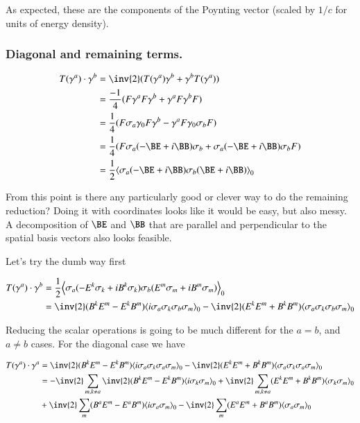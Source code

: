 As expected, these are the components of the Poynting vector (scaled by $1/c$ for units of energy density).

\subsubsection{Diagonal and remaining terms. }

\begin{align*}
T(\gamma^a) \cdot \gamma^b 
&= \inv{2} (T(\gamma^a) \gamma^b + \gamma^b T(\gamma^a)) \\
&= \frac{-1}{4} (F \gamma^a F \gamma^b + \gamma^a F \gamma^b F) \\
&= \frac{1}{4} (F \sigma_a \gamma_0 F \gamma^b - \gamma^a F \gamma_0 \sigma_b F) \\
&= \frac{1}{4} (F \sigma_a (-\BE + i \BB) \sigma_b + \sigma_a (-\BE + i \BB) \sigma_b F) \\
&= \frac{1}{2} \gpgradezero{\sigma_a (-\BE + i \BB) \sigma_b (\BE + i\BB) } \\
\end{align*}

From this point is there any particularly good or clever way to do the remaining reduction?  Doing it with 
coordinates looks like it would be easy, but also messy.  A decomposition of $\BE$ and $\BB$ that are parallel
and perpendicular to the spatial basis vectors also looks feasible.

Let's try the dumb way first

\begin{align*}
T(\gamma^a) \cdot \gamma^b 
&= \frac{1}{2} \gpgradezero{\sigma_a (-E^k \sigma_k + i B^k \sigma_k) \sigma_b (E^m \sigma_m + i B^m \sigma_m) } \\
&= 
\inv{2} (B^k E^m - E^k B^m) \gpgradezero{ i \sigma_a \sigma_k \sigma_b \sigma_m } 
- \inv{2} (E^k E^m + B^k B^m) \gpgradezero{ \sigma_a \sigma_k \sigma_b \sigma_m } \\
\end{align*}

Reducing the scalar operations is going to be much different for the $a = b$, and $a \ne b$ cases.  For the diagonal case
we have 

\begin{align*}
T(\gamma^a) \cdot \gamma^a 
&= 
\inv{2} (B^k E^m - E^k B^m) \gpgradezero{ i \sigma_a \sigma_k \sigma_a \sigma_m } 
- \inv{2} (E^k E^m + B^k B^m) \gpgradezero{ \sigma_a \sigma_k \sigma_a \sigma_m } \\
&= 
- \inv{2} \sum_{m, k \ne a} \inv{2} (B^k E^m - E^k B^m) \gpgradezero{ i \sigma_k \sigma_m } 
+ \inv{2} \sum_{m, k \ne a} (E^k E^m + B^k B^m) \gpgradezero{ \sigma_k \sigma_m } \\
&+ \inv{2} \sum_{m} (B^a E^m - E^a B^m) \gpgradezero{ i \sigma_a \sigma_m } 
- \inv{2} \sum_m (E^a E^m + B^a B^m) \gpgradezero{ \sigma_a \sigma_m } \\
\end{align*}

